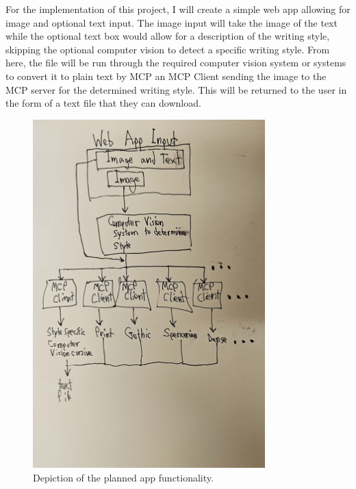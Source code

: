 \documentclass[12pt]{article}
\begin{document}
For the implementation of this project, I will create a simple web app allowing for image and optional text input. The image input will take the image of the text while the optional text box would allow for a description of the writing style, skipping the optional computer vision to detect a specific writing style. From here, the file will be run through the required computer vision system or systems to convert it to plain text by MCP an MCP Client sending the image to the MCP server for the determined writing style. This will be returned to the user in the form of a text file that they can download.
    \begin{figure}[htbp]
        \centering
		\includegraphics[width=0.8\textwidth]{./1000026679.jpg}
        \caption{Depiction of the planned app functionality.}
        \label{fig:myfigure1}
    \end{figure}
\end{document}
